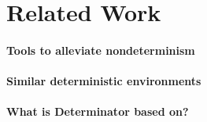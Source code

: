
\section{Related Work}

\paragraph{Tools to alleviate nondeterminism}

\paragraph{Similar deterministic environments}

\paragraph{What is Determinator based on?}

\endinput

